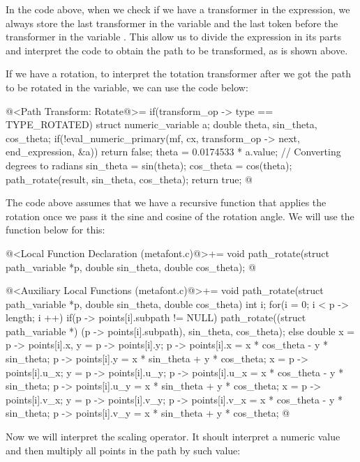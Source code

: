 In the code above, when we check if we have a transformer in the
expression, we always store the last transformer in the
variable  and the last token before the
transformer in the variable . This allow
us to divide the expression in its parts and interpret the code to
obtain the path to be transformed, as is shown above.

If we have a rotation, to interpret the totation transformer after we
got the path to be rotated in the  variable, we can
use the code below:

\iniciocodigo
@<Path Transform: Rotate@>=
if(transform_op -> type == TYPE_ROTATED){
  struct numeric_variable a;
  double theta, sin_theta, cos_theta;
  if(!eval_numeric_primary(mf, cx, transform_op -> next, end_expression,
                           &a))
    return false;
  theta = 0.0174533 * a.value; // Converting degrees to radians
  sin_theta = sin(theta);
  cos_theta = cos(theta);
  path_rotate(result, sin_theta, cos_theta);
  return true;
}
@
\fimcodigo

The code above assumes that we have a recursive function that applies
the rotation once we pass it the sine and cosine of the rotation
angle. We will use the function below for this:

\iniciocodigo
@<Local Function Declaration (metafont.c)@>+=
void path_rotate(struct path_variable *p, double sin_theta,
                 double cos_theta);
@
\fimcodigo

\iniciocodigo
@<Auxiliary Local Functions (metafont.c)@>+=
void path_rotate(struct path_variable *p, double sin_theta,
                 double cos_theta){
  int i;
  for(i = 0; i < p -> length; i ++){
    if(p -> points[i].subpath != NULL)
      path_rotate((struct path_variable *) (p -> points[i].subpath),
                  sin_theta, cos_theta);
    else{
      double x = p -> points[i].x, y = p -> points[i].y;
      p -> points[i].x = x * cos_theta - y * sin_theta;
      p -> points[i].y = x * sin_theta + y * cos_theta;
      x = p -> points[i].u_x;
      y = p -> points[i].u_y;
      p -> points[i].u_x = x * cos_theta - y * sin_theta;
      p -> points[i].u_y = x * sin_theta + y * cos_theta;
      x = p -> points[i].v_x;
      y = p -> points[i].v_y;
      p -> points[i].v_x = x * cos_theta - y * sin_theta;
      p -> points[i].v_y = x * sin_theta + y * cos_theta;
    }
  }
}
@
\fimcodigo

Now we will interpret the scaling operator. It shoult interpret a
numeric value and then multiply all points in the path by such value:

